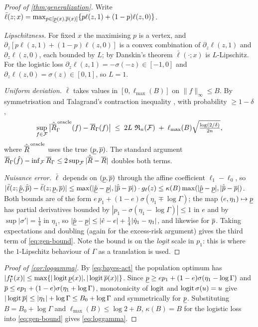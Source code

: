 \begin{proof}[Proof of \cref{thm:generalization}]
Write $\bar\ell(z;x)=\max_{p\in[\underline{p}(x),\overline{p}(x)]}\{p\ell(z,1)+(1-p)\ell(z,0)\}$.

\emph{Lipschitzness.} For fixed $x$ the maximising $p$ is a vertex, and
$\partial_z[p\ell(z,1)+(1-p)\ell(z,0)]$ is a convex combination of
$\partial_z\ell(z,1)$ and $\partial_z\ell(z,0)$, each bounded by $L$; by Danskin's
theorem $\bar\ell(\cdot;x)$ is $L$-Lipschitz. For the logistic loss
$\partial_z\ell(z,1)=-\sigma(-z)\in[-1,0]$ and
$\partial_z\ell(z,0)=\sigma(z)\in[0,1]$, so $L=1$.

\emph{Uniform deviation.} $\bar\ell$ takes values in $[0,\ell_{\max}(B)]$ on
$\|f\|_\infty\le B$. By symmetrisation and Talagrand's contraction inequality
\citep{bartlett2002rademacher}, with probability $\ge1-\delta$,
\[
  \sup_{f\in\mathcal{F}}\big|\hat{\overline{R}}^{\,\mathrm{oracle}}_\Gamma(f)-\overline{R}_\Gamma(f)\big|
  \;\le\; 2L\,\operatorname{\mathfrak{R}}_n(\mathcal{F})
  \;+\;\ell_{\max}(B)\sqrt{\tfrac{\log(2/\delta)}{2n}},
\]
where $\hat{\overline{R}}^{\,\mathrm{oracle}}$ uses the true $(\underline{p},\overline{p})$. The standard
argument $\overline{R}_\Gamma(\hat f) - \inf_{\mathcal{F}}\overline{R}_\Gamma
\le 2\sup_{\mathcal{F}}|\hat{\overline{R}}-\overline{R}|$ doubles both terms.

\emph{Nuisance error.} $\bar\ell$ depends on $(\underline{p},\overline{p})$ through the affine
coefficient $\ell_1-\ell_0$, so
$|\bar\ell(z;\hat{\underline{p}},\hat{\overline{p}})-\bar\ell(z;\underline{p},\overline{p})|
\le \max(|\hat{\underline{p}}-\underline{p}|,|\hat{\overline{p}}-\overline{p}|)\cdot g_\ell(z)
\le \kappa(B)\max(|\hat{\underline{p}}-\underline{p}|,|\hat{\overline{p}}-\overline{p}|)$.
Both bounds are of the form $e\,p_1+(1-e)\sigma(\eta_1\mp\log\Gamma)$; the map
$(e,\eta_1)\mapsto\underline{p}$ has partial derivatives bounded by
$|p_1-\sigma(\eta_1-\log\Gamma)|\le1$ in $e$ and by
$\sup|\sigma'|=\tfrac14$ in $\eta_1$, so
$|\hat{\underline{p}}-\underline{p}|\le|\hat e-e|+\tfrac14|\hat\eta_1-\eta_1|$, and likewise for
$\overline{p}$. Taking expectations and doubling (again for the excess-risk argument)
gives the third term of \eqref{eq:gen-bound}. Note the bound is on the
\emph{logit} scale in $p_1$: this is where the $1$-Lipschitz behaviour of
$\Gamma$ as a translation is used.
\end{proof}

\begin{proof}[Proof of \cref{cor:loggamma}]
By \eqref{eq:bayes-act} the population optimum has
$|f^\star_\Gamma(x)|\le\max\{|\operatorname{logit}\underline{p}(x)|,|\operatorname{logit}\overline{p}(x)|\}$. Since
$\underline{p}\ge e p_1 + (1-e)\sigma(\eta_1-\log\Gamma)$ and
$\overline{p}\le e p_1 + (1-e)\sigma(\eta_1+\log\Gamma)$, monotonicity of $\operatorname{logit}$ and
$\operatorname{logit}\sigma(u)=u$ give $|\operatorname{logit}\overline{p}|\le|\eta_1|+\log\Gamma\le B_0+\log\Gamma$
and symmetrically for $\underline{p}$. Substituting $B=B_0+\log\Gamma$ and
$\ell_{\max}(B)\le\log2+B$, $\kappa(B)=B$ for the logistic loss into
\eqref{eq:gen-bound} gives \eqref{eq:loggamma}.
\end{proof}

